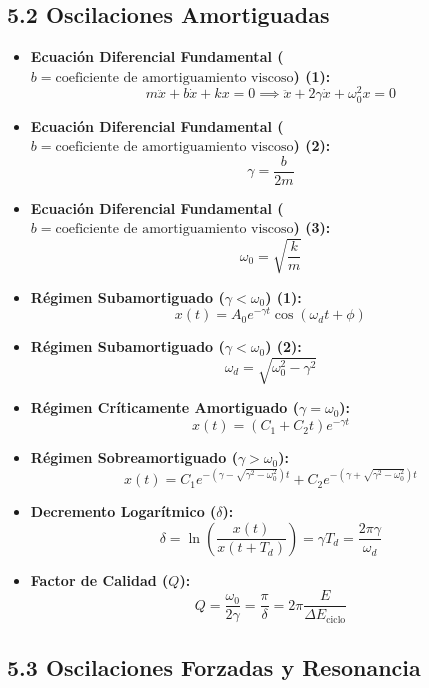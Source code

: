 \documentclass[11pt,a4paper]{article}
\begin{document}
\subsection*{5.2 Oscilaciones Amortiguadas}

\begin{itemize}
  \item \textbf{Ecuación Diferencial Fundamental ($b = \text{coeficiente de amortiguamiento viscoso}$) (1):}
  \[
    m \ddot{x} + b \dot{x} + k x = 0 \implies \ddot{x} + 2\gamma \dot{x} + \omega_0^2 x = 0
  \]
  \item \textbf{Ecuación Diferencial Fundamental ($b = \text{coeficiente de amortiguamiento viscoso}$) (2):}
  \[
    \gamma = \frac{b}{2m}
  \]
  \item \textbf{Ecuación Diferencial Fundamental ($b = \text{coeficiente de amortiguamiento viscoso}$) (3):}
  \[
    \omega_0 = \sqrt{\frac{k}{m}}
  \]
  \item \textbf{Régimen Subamortiguado ($\gamma < \omega_0$) (1):}
  \[
    x(t) = A_0 e^{-\gamma t} \cos(\omega_d t + \phi)
  \]
  \item \textbf{Régimen Subamortiguado ($\gamma < \omega_0$) (2):}
  \[
    \omega_d = \sqrt{\omega_0^2 - \gamma^2}
  \]
  \item \textbf{Régimen Críticamente Amortiguado ($\gamma = \omega_0$):}
  \[
    x(t) = (C_1 + C_2 t) e^{-\gamma t}
  \]
  \item \textbf{Régimen Sobreamortiguado ($\gamma > \omega_0$):}
  \[
    x(t) = C_1 e^{-(\gamma - \sqrt{\gamma^2 - \omega_0^2})t} + C_2 e^{-(\gamma + \sqrt{\gamma^2 - \omega_0^2})t}
  \]
  \item \textbf{Decremento Logarítmico ($\delta$):}
  \[
    \delta = \ln\left( \frac{x(t)}{x(t + T_d)} \right) = \gamma T_d = \frac{2\pi \gamma}{\omega_d}
  \]
  \item \textbf{Factor de Calidad ($Q$):}
  \[
    Q = \frac{\omega_0}{2\gamma} = \frac{\pi}{\delta} = 2\pi \frac{E}{\Delta E_{\text{ciclo}}}
  \]
\end{itemize}

\subsection*{5.3 Oscilaciones Forzadas y Resonancia}
\end{document}
